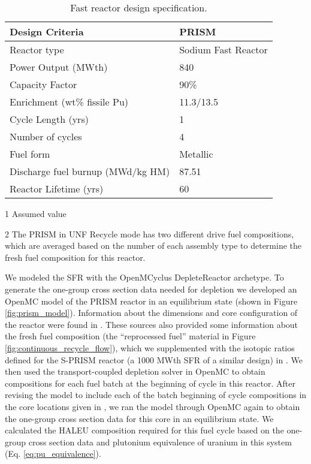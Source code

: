 \begin{table}[h!]
    \centering
    \begin{threeparttable}

    \caption{Fast reactor design specification.}
    \label{tab:fast_rx}
    \begin{tabular}{l l}
        \hline
        Design Criteria & PRISM \cite{triplett_prism:_2012,fichtlscherer_assessing_2019}\\
        \hline
        Reactor type & Sodium Fast Reactor\\
        Power Output (MWth) & 840 \\
        Capacity Factor & 90\%\tnote{1} \\
        Enrichment (wt\% fissile Pu) &  11.3/13.5\tnote{2}\\
        Cycle Length (yrs) & 1 \\
        Number of cycles &  4\\
        Fuel form &  Metallic \\
        Discharge fuel burnup (MWd/kg HM) & 87.51 \\
        Reactor Lifetime (yrs)&  60\\
        \hline
    \end{tabular}
    \begin{tablenotes}
        \item [1] Assumed value
        \item [2] The PRISM in UNF Recycle mode has two different drive fuel compositions,
                  which are averaged based on the number of each assembly type to determine 
                  the fresh fuel composition for this reactor.
    \end{tablenotes}
\end{threeparttable}
\end{table}

We modeled the \gls{SFR} with the OpenMCyclus DepleteReactor archetype.
To generate the one-group cross section data needed for 
depletion we developed an OpenMC model of the PRISM reactor in 
an equilibrium state (shown in 
Figure \ref{fig:prism_model}). Information about the 
dimensions and core configuration of the reactor were found in 
\cite{triplett_prism:_2012,fichtlscherer_assessing_2019}. 
These sources also provided some 
information about the fresh fuel composition (the ``reprocessed 
fuel'' material in Figure \ref{fig:continuous_recycle_flow}), which 
we supplemented 
with the isotopic ratios defined for the S-PRISM reactor (a 1000 MWth
\gls{SFR} of a similar design) in \cite{sumner_effects_2011}.
We then used the transport-coupled depletion solver in OpenMC to 
obtain compositions for each fuel batch at the beginning of cycle 
in this reactor. After revising the model to include each of the 
batch beginning of cycle compositions in the core locations given 
in \cite{fichtlscherer_assessing_2019}, we ran the model 
through OpenMC again to obtain the one-group cross section data 
for this core in an equilibrium state. We calculated
the \gls{HALEU} composition required for this fuel cycle based on the
one-group cross section data and plutonium equivalence of 
uranium in this system (Eq. \ref{eq:pu_equivalence}).


